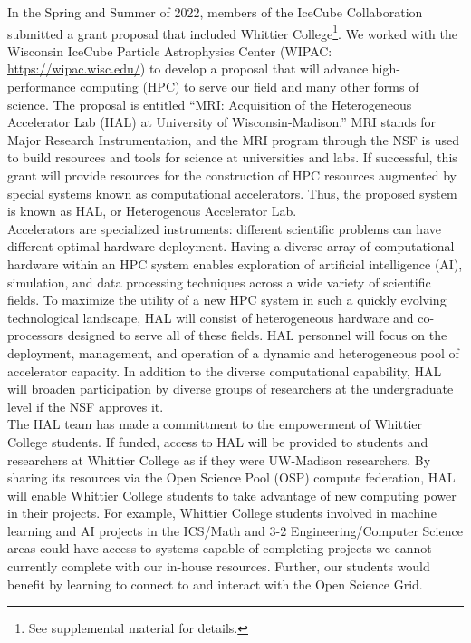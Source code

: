 \documentclass[../../../main.tex]{subfiles}
\begin{document}
In the Spring and Summer of 2022, members of the IceCube Collaboration submitted a grant proposal that included Whittier College\footnote{See supplemental material for details.}.  We worked with the Wisconsin IceCube Particle Astrophysics Center (WIPAC: \url{https://wipac.wisc.edu/}) to develop a proposal that will advance high-performance computing (HPC) to serve our field and many other forms of science.  The proposal is entitled ``MRI: Acquisition of the Heterogeneous Accelerator Lab (HAL) at University of Wisconsin-Madison.''  MRI stands for Major Research Instrumentation, and the MRI program through the NSF is used to build resources and tools for science at universities and labs.  If successful, this grant will provide resources for the construction of HPC resources augmented by special systems known as computational accelerators.  Thus, the proposed system is known as HAL, or Heterogenous Accelerator Lab.
\\
\vspace{0.15cm}
Accelerators are specialized instruments: different scientific problems can have different optimal hardware deployment.  Having a diverse array of computational hardware within an HPC system enables exploration of artificial intelligence (AI), simulation, and data processing techniques across a wide variety of scientific fields.  To maximize the utility of a new HPC system in such a quickly evolving technological landscape, HAL will consist of heterogeneous hardware and co-processors designed to serve all of these fields. HAL personnel will focus on the deployment, management, and operation of a dynamic and heterogeneous pool of accelerator capacity.  In addition to the diverse computational capability, HAL will broaden participation by diverse groups of researchers at the undergraduate level if the NSF approves it.
\\
\vspace{0.15cm}
The HAL team has made a committment to the empowerment of Whittier College students.  If funded, access to HAL will be provided to students and researchers at Whittier College as if they were UW-Madison researchers.  By sharing its resources via the
Open Science Pool (OSP) compute federation, HAL will enable Whittier College students to take advantage of new computing power in their projects.  For example, Whittier College students involved in machine learning and AI projects in the ICS/Math and 3-2 Engineering/Computer Science areas could have access to systems capable of completing projects we cannot currently complete with our in-house resources.  Further, our students would benefit by learning to connect to and interact with the Open Science Grid.
\end{document}
